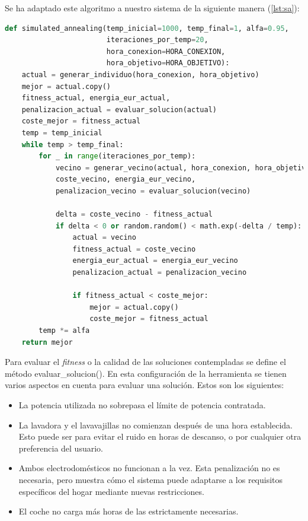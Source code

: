 \documentclass[11pt,a4paper]{book}
\begin{document}
Se ha adaptado este algoritmo a nuestro sistema de la siguiente manera (\autoref{lst:sa}): 
\begin{lstlisting}[language=Python, caption={Algoritmo de Recocido Simulado (\texttt{simulated\_annealing})}, label={lst:sa}]
def simulated_annealing(temp_inicial=1000, temp_final=1, alfa=0.95, 
                        iteraciones_por_temp=20, 
                        hora_conexion=HORA_CONEXION, 
                        hora_objetivo=HORA_OBJETIVO):
    actual = generar_individuo(hora_conexion, hora_objetivo)
    mejor = actual.copy()
    fitness_actual, energia_eur_actual, 
    penalizacion_actual = evaluar_solucion(actual)
    coste_mejor = fitness_actual
    temp = temp_inicial
    while temp > temp_final:
        for _ in range(iteraciones_por_temp):
            vecino = generar_vecino(actual, hora_conexion, hora_objetivo)
            coste_vecino, energia_eur_vecino, 
            penalizacion_vecino = evaluar_solucion(vecino)

            delta = coste_vecino - fitness_actual
            if delta < 0 or random.random() < math.exp(-delta / temp):
                actual = vecino
                fitness_actual = coste_vecino
                energia_eur_actual = energia_eur_vecino
                penalizacion_actual = penalizacion_vecino

                if fitness_actual < coste_mejor:
                    mejor = actual.copy()
                    coste_mejor = fitness_actual
        temp *= alfa
    return mejor
\end{lstlisting}
Para evaluar el \textit{fitness} o la calidad de las soluciones contempladas se define el método evaluar\_solucion(). En esta configuración de la herramienta se tienen varios aspectos en cuenta para evaluar una solución. Estos son los siguientes:
\begin{itemize}
    \item La potencia utilizada no sobrepasa el límite de potencia contratada.
    \item La lavadora y el lavavajillas no comienzan después de una hora establecida. Esto puede ser para evitar el ruido en horas de descanso, o por cualquier otra preferencia del usuario.
    \item Ambos electrodomésticos no funcionan a la vez. Esta penalización no es necesaria, pero muestra cómo el sistema puede adaptarse a los requisitos específicos del hogar mediante nuevas restricciones.
    \item El coche no carga más horas de las estrictamente necesarias.
\end{itemize}
\end{document}
